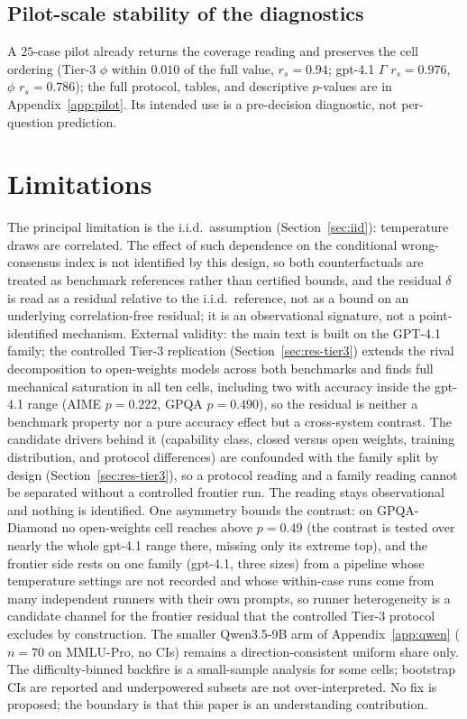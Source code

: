 \documentclass{article}
\newcommand{\agreementIndex}{\Gamma}
\begin{document}
\subsection{Pilot-scale stability of the diagnostics}
\label{sec:res-pilot}

A $25$-case pilot already returns the coverage reading and preserves the
cell ordering (Tier-3 $\phi$ within $0.010$ of the full value,
$r_s=0.94$; gpt-4.1 $\agreementIndex$ $r_s=0.976$, $\phi$ $r_s=0.786$); the full
protocol, tables, and descriptive $p$-values are in
Appendix~\ref{app:pilot}. Its intended use is a pre-decision diagnostic,
not per-question prediction.

\section{Limitations}
\label{sec:limitations}

The principal limitation is the i.i.d.\ assumption (Section~\ref{sec:iid}):
temperature draws are correlated. The effect of such dependence on the
conditional wrong-consensus index is not identified by this design, so
both counterfactuals are treated as benchmark
references rather than certified bounds, and the residual $\delta$ is
read as a residual relative to the i.i.d.\ reference, not as a bound on
an underlying correlation-free residual; it is
an observational signature, not a point-identified mechanism. External
validity: the main text is built on the GPT-4.1 family; the controlled
Tier-3 replication (Section~\ref{sec:res-tier3}) extends the rival
decomposition to open-weights models across both benchmarks and finds
full mechanical saturation in all ten cells, including two with accuracy
inside the gpt-4.1 range (AIME $p=0.222$, GPQA $p=0.490$), so the residual is neither a
benchmark property nor a pure accuracy effect but a cross-system
contrast. The candidate drivers behind it (capability class, closed versus open weights, training distribution, and protocol differences) are confounded with the family split by design (Section~\ref{sec:res-tier3}), so a protocol reading and a family reading cannot be separated without a controlled frontier run. The
reading stays observational and nothing is identified. One asymmetry bounds the contrast: on
GPQA-Diamond no open-weights cell reaches above $p=0.49$ (the contrast is
tested over nearly the whole gpt-4.1 range there, missing only its
extreme top), and the
frontier side rests on one family (gpt-4.1, three sizes) from a
pipeline whose temperature settings are not recorded and whose
within-case runs come from many independent runners with their own
prompts, so runner heterogeneity is a candidate channel for the
frontier residual that the controlled Tier-3 protocol excludes by
construction. The smaller
Qwen3.5-9B arm of Appendix~\ref{app:qwen} ($n=70$ on MMLU-Pro, no CIs)
remains a direction-consistent uniform share only. The difficulty-binned backfire is a small-sample analysis for some
cells; bootstrap CIs are reported and underpowered subsets are not
over-interpreted. No fix is proposed; the boundary is that this
paper is an understanding contribution.
\end{document}
